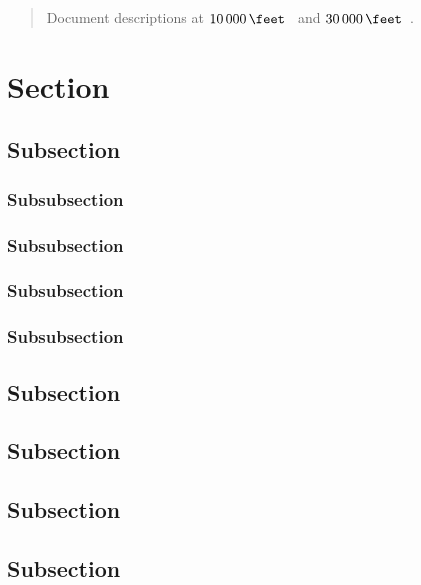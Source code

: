\pagestyle{ruled}

\begin{abstract}
Document descriptions at $\qty{10 000}{\feet}$~\cite{example} and $\qty{30 000}{\feet}$~\cite{example,example2,example3}.
\end{abstract}

\section{Section}

\subsection{Subsection}
\subsubsection{Subsubsection}
\subsubsection{Subsubsection}
\subsubsection{Subsubsection}
\subsubsection{Subsubsection}

\subsection{Subsection}
\subsection{Subsection}
\subsection{Subsection}
\subsection{Subsection}

\clearpage

